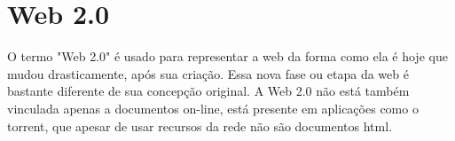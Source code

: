 \documentclass[
	12pt,				%
	openright,			%
	twoside,			%
	a4paper,			%
	Times,
	brazil,				%
	]{abntex2}
\begin{document}
\tableofcontents*
\cleardoublepage



\textual





\chapter{Web 2.0}
O termo "Web 2.0" é usado para representar a web da forma como ela é hoje que mudou drasticamente, após sua criação. Essa nova fase ou etapa da web é bastante diferente de sua concepção original. A Web 2.0 não está também vinculada apenas a documentos on-line, está presente em aplicações como o torrent, que apesar de usar recursos da rede não são documentos html.
\par
\end{document}
